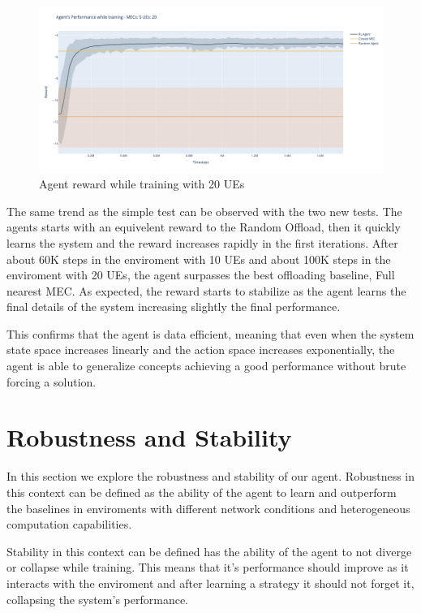 \begin{figure}[H]
  \centering
  \includegraphics[width=\textwidth]{images/5_20_training.png}
  \caption{Agent reward while training with 20 \acrshort{UE}s}  \label{5_20_training}
\end{figure}

The same trend as the simple test can be observed with the two new tests. The agents starts with an equivelent reward to the Random Offload, then it quickly learns the system and the reward increases rapidly in the first iterations. After about 60K steps in the enviroment with 10 \acrshort{UE}s and about 100K steps in the enviroment with 20 \acrshort{UE}s, the agent surpasses the best offloading baseline, Full nearest MEC. As expected, the reward starts to stabilize as the agent learns the final details of the system increasing slightly the final performance.

This confirms that the agent is data efficient, meaning that even when the system state space increases linearly and the action space increases exponentially, the agent is able to generalize concepts achieving a good performance without brute forcing a solution.

\section{Robustness and Stability}

In this section we explore the robustness and stability of our agent. Robustness in this context can be defined as the ability of the agent to learn and outperform the baselines in enviroments with different network conditions and heterogeneous computation capabilities. 

Stability in this context can be defined has the ability of the agent to not diverge or collapse while training. This means that it's performance should improve as it interacts with the enviroment and after learning a strategy it should not forget it, collapsing the system's performance.

